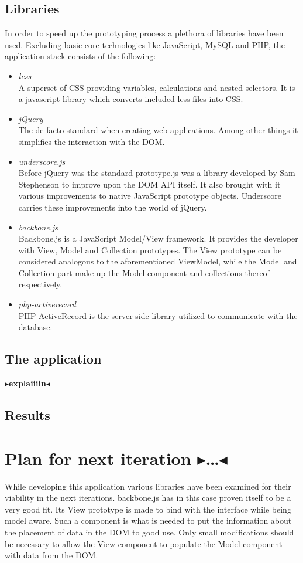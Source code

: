 \documentclass[twoside,11pt,openright]{report}
\newcommand{\todo}[1]{{\color[rgb]{.5,0,0}\textbf{$\blacktriangleright$#1$\blacktriangleleft$}}}
\begin{document}
\subsection{Libraries}
In order to speed up the prototyping process a plethora of libraries have been
used. Excluding basic core technologies like JavaScript, MySQL and PHP, the
application stack consists of the following:
\begin{itemize}
	\item \emph{less}\\
	A superset of CSS providing variables, calculations and nested selectors. It
	is a javascript library which converts included less files into CSS.
	\item \emph{jQuery}\\
	The de facto standard when creating web applications. Among other things it
	simplifies the interaction with the DOM.
	\item \emph{underscore.js}\\
	Before jQuery was the standard prototype.js was a library developed by
	Sam Stephenson to improve upon the DOM API itself. It also brought with it
	various improvements to native JavaScript prototype objects. Underscore
	carries these improvements into the world of jQuery.
	\item \emph{backbone.js}\\
	Backbone.js is a JavaScript Model/View framework. It provides the developer
	with View, Model and Collection prototypes. The View prototype can be
	considered analogous to the aforementioned ViewModel, while the Model and
	Collection part make up the Model component and collections thereof
	respectively.
	\item \emph{php-activerecord}\\
	PHP ActiveRecord is the server side library utilized to communicate with the
	database.
	
\end{itemize}

\subsection{The application}
\todo{explaiiiin}
\subsection{Results}
\section{Plan for next iteration \todo{\dots}}
While developing this application various libraries have been examined for
their viability in the next iterations. backbone.js has in this case proven
itself to be a very good fit. Its View prototype is made to bind with the
interface while being model aware. Such a component is what is needed to put the
information about the placement of data in the DOM to good use. Only small
modifications should be necessary to allow the View component to populate the
Model component with data from the DOM.
\end{document}

